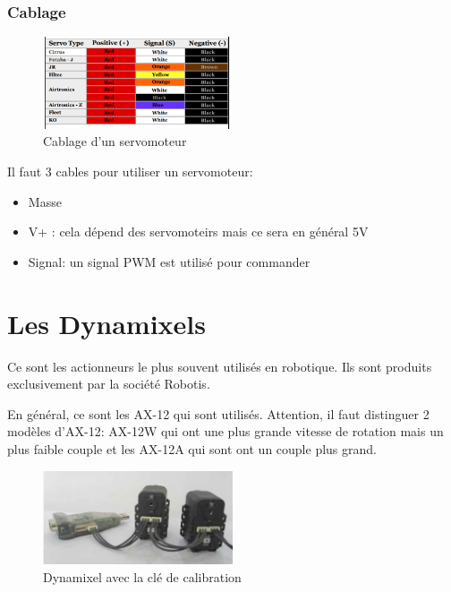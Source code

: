 \documentclass[a4paper, 11pt]{report}
\begin{document}
\subsubsection{Cablage}

\begin{figure}[h!]
\begin{centering}
\includegraphics[width=0.5\textwidth]{images/colorCodeCableServo.png}
\caption{Cablage d'un servomoteur}
\par\end{centering}
\end{figure}

Il faut 3 cables pour utiliser un servomoteur:
\begin{itemize}
\item Masse
\item V+ : cela dépend des servomoteirs mais ce sera en général 5V
\item Signal: un signal PWM est utilisé pour commander 
\end{itemize}

\section{Les Dynamixels}
Ce sont les actionneurs le plus souvent utilisés en robotique. Ils sont produits exclusivement par la société Robotis.

En général, ce sont les AX-12 qui sont utilisés. Attention, il faut distinguer 2 modèles d'AX-12: AX-12W qui ont une plus grande vitesse de rotation mais un plus faible couple et les AX-12A qui sont ont un couple plus grand.

\begin{figure}[h!]
\begin{centering}
\includegraphics[width=0.5\textwidth]{images/dynamixel.jpg}
\caption{Dynamixel avec la clé de calibration}
\par\end{centering}
\end{figure}
\end{document}
